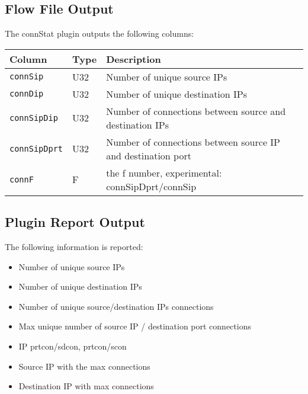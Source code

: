 \documentclass[documentation]{subfiles}
\begin{document}
\subsection{Flow File Output}
The connStat plugin outputs the following columns:
\begin{longtable}{lll}
    \toprule
    {\bf Column} & {\bf Type} & {\bf Description} \\
    \midrule\endhead%
    {\tt connSip}     & U32 & Number of unique source IPs\\
    {\tt connDip}     & U32 & Number of unique destination IPs\\
    {\tt connSipDip}  & U32 & Number of connections between source and destination IPs\\
    {\tt connSipDprt} & U32 & Number of connections between source IP and destination port \\
    {\tt connF}       &   F & the f number, experimental: connSipDprt/connSip \\
    \bottomrule
\end{longtable}

\subsection{Plugin Report Output}
The following information is reported:
\begin{itemize}
    \item Number of unique source IPs
    \item Number of unique destination IPs
    \item Number of unique source/destination IPs connections
    \item Max unique number of source IP / destination port connections
    \item IP prtcon/sdcon, prtcon/scon
    \item Source IP with the max connections
    \item Destination IP with max connections
\end{itemize}

\end{document}
